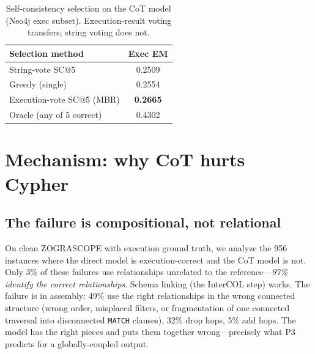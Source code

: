 \documentclass[11pt]{article}
\begin{document}
\begin{table}[t]\centering
\caption{Self-consistency selection on the CoT model (Neo4j exec subset). Execution-result voting
transfers; string voting does not.}
\label{tab:select}
\begin{tabular}{lc}
\toprule
Selection method & Exec EM \\
\midrule
String-vote SC@5 & 0.2509 \\
Greedy (single) & 0.2554 \\
Execution-vote SC@5 (MBR) & \textbf{0.2665} \\
Oracle (any of 5 correct) & 0.4302 \\
\bottomrule
\end{tabular}
\end{table}

\section{Mechanism: why CoT hurts Cypher}
\label{sec:mech}
\subsection{The failure is compositional, not relational}
On clean ZOGRASCOPE with execution ground truth, we analyze the 956 instances where the direct model
is execution-correct and the CoT model is not. Only 3\% of these failures use relationships unrelated
to the reference---\emph{97\% identify the correct relationships}. Schema linking (the InterCOL step)
works. The failure is in assembly: 49\% use the right relationships in the wrong connected structure
(wrong order, misplaced filters, or fragmentation of one connected traversal into disconnected
\texttt{MATCH} clauses), 32\% drop hops, 5\% add hops. The model has the right pieces and puts them
together wrong---precisely what P3 predicts for a globally-coupled output.
\end{document}
